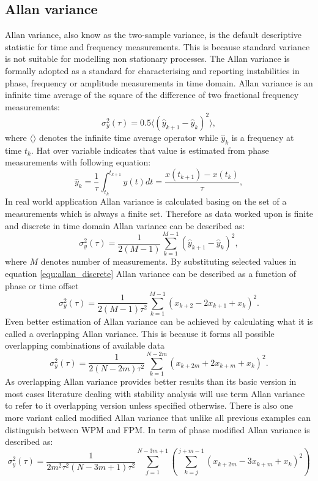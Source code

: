 \subsection{Allan variance}
Allan variance, also know as the two-sample variance, is the default descriptive statistic
for time and frequency measurements.
This is because standard variance is not suitable for modelling non stationary processes.
The Allan variance is formally adopted as a standard for characterising and reporting instabilities
in phase, frequency or amplitude measurements in time domain.
Allan variance is an infinite time average of the square of the difference of two fractional
frequency measurements:
\begin{equation}
	\label{equ:allan_first}
	\sigma^{2}_{y}(\tau)=0.5\langle (\hat{y}_{k+1}-\hat{y}_k)^{2}  \rangle,
\end{equation}
where $\langle \rangle$ denotes the infinite time average operator while $\hat{y}_k$ is a 
frequency at time $t_{k}$. Hat over variable indicates that value is estimated from phase
measurements with following equation:
\begin{equation}
	\label{equ:y_hat}
	\hat{y}_{k}=\frac{1}{\tau}\int^{t_{k+1}}_{t_{k}}y(t)dt =
	\frac{x(t_{k+1})-x(t_{k})}{\tau},
\end{equation}
In real world application Allan variance is calculated basing on the set of a measurements which
is always a finite set. Therefore as data worked upon is finite and discrete in time domain 
Allan variance can be described as:
\begin{equation}
	\label{equ:allan_discrete}
	\sigma^{2}_{y}(\tau) = \frac{1}{2(M-1)}\sum^{M-1}_{k=1}(\hat{y}_{k+1}-\hat{y}_{k})^2,
\end{equation}
where $M$ denotes number of measurements.
By substituting selected values in equation \ref{equ:allan_discrete} Allan variance can be
described as a function of phase or time offset
\begin{equation}
	\label{equ:allan_discrete2}
	\sigma^{2}_{y}(\tau) = \frac{1}{2(M-1)\tau^{2}}\sum^{M-1}_{k=1}(x_{k+2}-2x_{k+1}+x_{k})^2.
\end{equation}
Even better estimation of Allan variance can be achieved by calculating what it is called a
overlapping Allan variance. This is because it forms all possible overlapping combinations of
available data
\begin{equation}
	\label{equ:overlapping_allan}
	\sigma^{2}_{y}(\tau) = \frac{1}{2(N-2m)\tau^{2}}\sum^{N-2m}_{k=1}(x_{k+2m}+2x_{k+m}+x_{k})^2.
\end{equation}
As overlapping Allan variance provides better results than its basic version in most cases 
literature dealing with stability analysis will use term Allan variance to refer to it 
overlapping version unless specified otherwise.
There is also one more variant called modified Allan variance that unlike all previous examples
can distinguish between WPM and FPM.
In term of phase modified Allan variance is described as:
\begin{equation}
	\label{equ:modified_allan}
	\sigma^{2}_{y}(\tau)=\frac{1}{2m^{2}\tau^{2}(N-3m+1)\tau^{2}}\sum^{N-3m+1}_{j=1}(
	\sum^{j+m-1}_{k=j}(x_{k+2m}-3x_{k+m}+x_{k})^2)
\end{equation}

